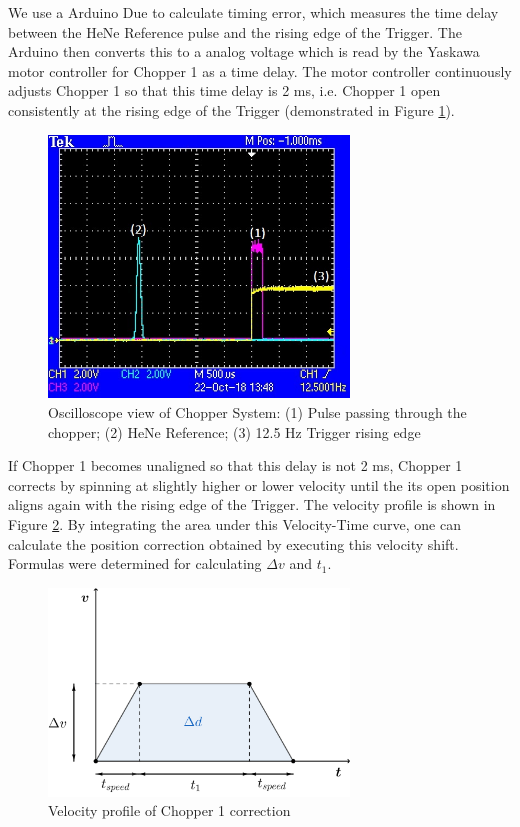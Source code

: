\documentclass{article}
\begin{document}
        We use a Arduino Due to calculate timing error, which measures the time delay between the HeNe Reference pulse and the rising edge of the Trigger. The Arduino then converts this to a analog voltage which is read by the Yaskawa motor controller for Chopper 1 as a time delay. The motor controller continuously adjusts Chopper 1 so that this time delay is 2 ms, i.e. Chopper 1 open consistently at the rising edge of the Trigger (demonstrated in Figure \ref{fig:chopper_osc}).
        
        \begin{figure}[h]
            \centering
            \includegraphics[width=8cm]{img/chopper_osc}
            \caption{Oscilloscope view of Chopper System: (1) Pulse passing through the chopper; (2) HeNe Reference; (3) 12.5 Hz Trigger rising edge}
            \label{fig:chopper_osc}
        \end{figure}
        
        If Chopper 1 becomes unaligned so that this delay is not 2 ms, Chopper 1 corrects by spinning at slightly higher or lower velocity until the its open position aligns again with the rising edge of the Trigger. The velocity profile is shown in Figure \ref{fig:chopper_vel_profile}. By integrating the area under this Velocity-Time curve, one can calculate the position correction obtained by executing this velocity shift. Formulas were determined for calculating $\Delta v$ and $t_1$. 
        
        \begin{figure}
            \centering
            \includegraphics[width=8cm]{img/chopper_vel_profile}
            \caption{Velocity profile of Chopper 1 correction}
            \label{fig:chopper_vel_profile}
        \end{figure}
        
\end{document}

